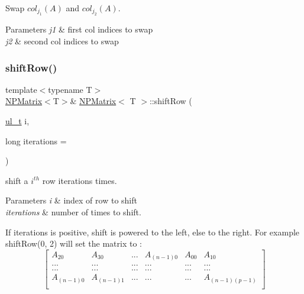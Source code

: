 Swap $ col_{j_1}(A) $ and $ col_{j_2}(A) $. 


\begin{DoxyParams}{Parameters}
{\em j1} & first col indices to swap \\
\hline
{\em j2} & second col indices to swap \\
\hline
\end{DoxyParams}
\mbox{\label{class_n_p_matrix_a8927e2dc64af30c6f619a93678332093}} 
\subsubsection{\texorpdfstring{shiftRow()}{shiftRow()}}
{\footnotesize\ttfamily template$<$typename T$>$ \\
\mbox{\hyperlink{class_n_p_matrix}{N\+P\+Matrix}}$<$T$>$\& \mbox{\hyperlink{class_n_p_matrix}{N\+P\+Matrix}}$<$ T $>$\+::shift\+Row (\begin{DoxyParamCaption}\item[{\mbox{\hyperlink{typedef_8h_a1b140a2034db3f5dfe18a987745df43a}{ul\+\_\+t}}}]{i,  }\item[{long}]{iterations = {} }\end{DoxyParamCaption})\hspace{0.3cm}{\ttfamily [inline]}}



shift a $ i^{th} $ row iterations times. 


\begin{DoxyParams}{Parameters}
{\em i} & index of row to shift \\
\hline
{\em iterations} & number of times to shift.\\
\hline
\end{DoxyParams}
If {\ttfamily iterations} is positive, shift is powered to the left, else to the right. For example {\ttfamily shift\+Row(0, 2)} will set the matrix to \+: \[ \begin{bmatrix} A_{20} & A_{30} & ... & A_{(n-1)0} & A_{00} & A_{10} \\ ... & ... & ... & ... & ... & ... \\ ... & ... & ... & ... & ... & ... \\ A_{(n-1)0} & A_{(n-1)1} & ... & ... & ... & A_{(n-1)(p-1)}\\ \end{bmatrix} \] \mbox{\label{class_n_p_matrix_ae039695bf1464be6563f81d6e0c502d8}} 
